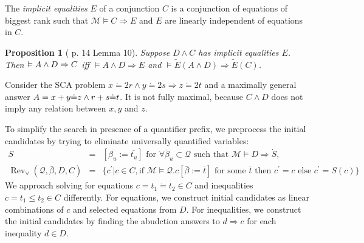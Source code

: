 \documentclass{article}
\newcommand{\assign}{:=}
\newcommand{\tmem}[1]{{\em #1\/}}
\newcommand{\tmop}[1]{\ensuremath{\operatorname{#1}}}
\newtheorem{proposition}{Proposition}
\begin{document}
The {\tmem{implicit equalities}} $E$ of a conjunction $C$ is a conjunction of
equations of biggest rank such that $\mathcal{M} \vDash C \Rightarrow E$ and
$E$ are linearly independent of equations in $C$.

\begin{proposition}[{\cite{AbductionLinArithMaher}} p. 14 Lemma 10]
  Suppose $D \wedge C$ has implicit equalities $E$. Then $\vDash A \wedge
  {\nobreak} D \Rightarrow C$ iff $\vDash A \wedge D \Rightarrow E$ and
  $\vDash \tilde{E} (A \wedge D) \Rightarrow \tilde{E} (C)$.
\end{proposition}

Consider the SCA problem $x \dot{=} 2 r \wedge y \dot{=} 2 s \Rightarrow z
\dot{=} 2 t$ and a maximally general answer $A = x + {\nobreak} y \dot{=} z
\wedge r + s \dot{=} t$. It is not fully maximal, because $C \wedge D$ does
not imply any relation between $x, y$ and $z$.

To simplify the search in presence of a quantifier prefix, we preprocess the
initial candidates by trying to eliminate universally quantified variables:
\begin{eqnarray*}
  S & = & [\overline{\beta_u} \assign \overline{t_u}] \text{ for }
  \overline{\forall \beta_u} \subset \mathcal{Q} \text{ such that }
  \mathcal{M} \vDash D \Rightarrow \dot{S},\\
  \tmop{Rev}_{\forall} (\mathcal{Q}, \bar{\beta}, D, C) & = & \{ c^{\prime} |
  c \in C, \text{if } \mathcal{M} \vDash \mathcal{Q}.c [\bar{\beta} \assign
  \bar{t}] \text{ for some } \bar{t} \text{ then } c^{\prime} = c \text{ else
  } c^{\prime} = S (c) \}
\end{eqnarray*}
We approach solving for equations $c = t_1 \dot{=} t_2 \in C$ and inequalities
$c = t_1 \leqslant t_2 \in C$ differently. For equations, we construct initial
candidates as linear combinations of $c$ and selected equations from $D$. For
inequalities, we construct the initial candidates by finding the abudction
answers to $d \Rightarrow c$ for each inequality $d \in D$.
\end{document}
